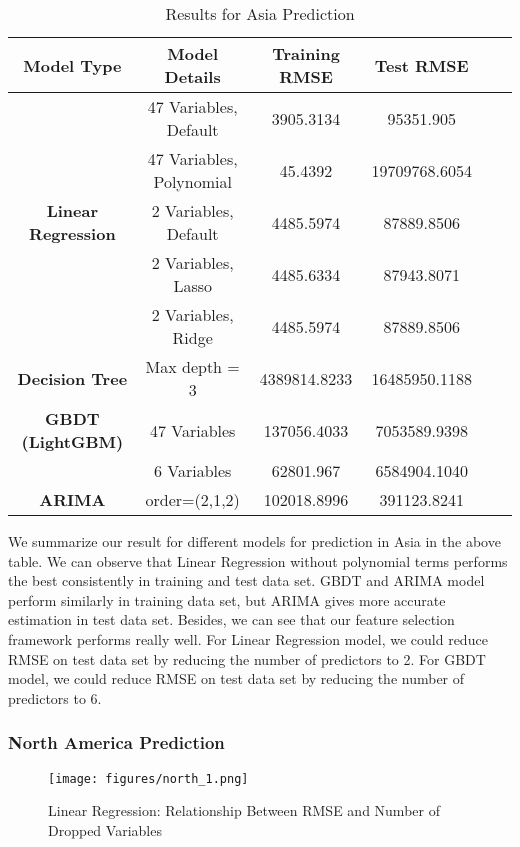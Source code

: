 \documentclass{article}
\begin{document}
\begin{table}[H]
        \centering
        \caption{Results for Asia Prediction}\label{tab:results}
        \begin{tabular}{c c c c c c}
            \toprule
            Model Type & Model Details & Training RMSE & Test RMSE\\
            \hline
            & 47 Variables, Default & 3905.3134 & 95351.905 \\
            & 47 Variables, Polynomial & 45.4392 & 19709768.6054 \\
            \textbf{Linear Regression}& 2 Variables, Default & 4485.5974 & 87889.8506 \\
            & 2 Variables, Lasso & 4485.6334 & 87943.8071 \\
            & 2 Variables, Ridge & 4485.5974 & 87889.8506 \\
            \hline
            \textbf{Decision Tree}& Max depth = 3 & 4389814.8233 & 16485950.1188  \\
            \hline
            \textbf{GBDT (LightGBM)}& 47 Variables & 137056.4033 & 7053589.9398 \\
            & 6 Variables & 62801.967 & 6584904.1040\\
            \hline
            \textbf{ARIMA}& order=(2,1,2)  & 102018.8996 & 391123.8241 \\
            \bottomrule
        \end{tabular}
\end{table}

\noindent We summarize our result for different models for prediction in Asia in the above table. We can observe that Linear Regression without polynomial terms performs the best consistently in training and test data set. GBDT and ARIMA model perform similarly in training data set, but ARIMA gives more accurate estimation in test data set. Besides, we can see that our feature selection framework performs really well. For Linear Regression model, we could reduce RMSE on test data set by reducing the number of predictors to 2. For GBDT model,  we could reduce RMSE on test data set by reducing the number of predictors to 6. \\


\subsubsection{North America Prediction}

\begin{figure}[H]
    \centering
    \texttt{[image: figures/north\_1.png]}%
    \caption{Linear Regression: Relationship Between RMSE and Number of Dropped Variables}
    \label{fig:heatmap}
\end{figure}
\end{document}
